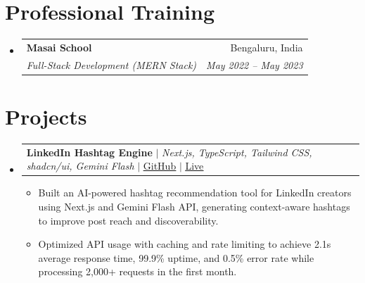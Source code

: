 \documentclass[letterpaper,11pt]{article}
\makeatletter
\newcommand{\resumeItem}[1]{
  \item\small{
    {#1 \vspace{-2pt}}
  }
}
\newcommand{\resumeSubheading}[4]{
  \vspace{-2pt}\item
    \begin{tabular*}{0.97\textwidth}[t]{l@{\extracolsep{\fill}}r}
      \textbf{#1} & #2 \\
      \textit{\small#3} & \textit{\small #4} \\
    \end{tabular*}\vspace{-7pt}
}
\newcommand{\resumeProjectHeading}[2]{
    \item
    \begin{tabular*}{0.97\textwidth}{l@{\extracolsep{\fill}}r}
      \small#1 & #2 \\
    \end{tabular*}\vspace{-7pt}
}
\newcommand{\resumeSubHeadingListStart}{\begin{itemize}[leftmargin=0.15in, label={}]}
\newcommand{\resumeSubHeadingListEnd}{\end{itemize}}
\newcommand{\resumeItemListStart}{\begin{itemize}}
\newcommand{\resumeItemListEnd}{\end{itemize}\vspace{-5pt}}
\makeatother
\begin{document}
\section{Professional Training}
  \resumeSubHeadingListStart
    \resumeSubheading
      {Masai School}
      {Bengaluru, India}
      {Full-Stack Development (MERN Stack)}
      {May 2022 -- May 2023}
  \resumeSubHeadingListEnd

\section{Projects}
  \resumeSubHeadingListStart

    \resumeProjectHeading
      {\textbf{LinkedIn Hashtag Engine} $|$ \emph{Next.js, TypeScript, Tailwind CSS, shadcn/ui, Gemini Flash} $|$
      \href{https://github.com/Saurav02022/linkedin-hashtag-refresh-engine-app}{\underline{GitHub}} $|$
      \href{https://ai-linkedin-hashtag-refresh-engine-app.vercel.app}{\underline{Live}}}{}
      \resumeItemListStart
        \resumeItem{Built an AI-powered hashtag recommendation tool for LinkedIn creators using Next.js and Gemini Flash API, generating context-aware hashtags to improve post reach and discoverability.}
        \resumeItem{Optimized API usage with caching and rate limiting to achieve 2.1s average response time, 99.9\% uptime, and 0.5\% error rate while processing 2,000+ requests in the first month.}
      \resumeItemListEnd


  \resumeSubHeadingListEnd


\end{document}
